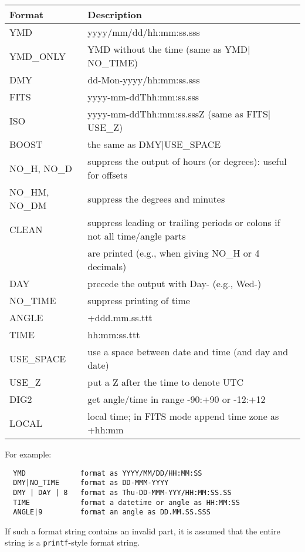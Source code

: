 \begin{itemize}
\begin{tabular}{ll}
  Format & Description \\ \hline
 YMD & yyyy/mm/dd/hh:mm:ss.sss\\
 YMD\_ONLY & YMD without the time (same as YMD$|$NO\_TIME)\\
 DMY & dd-Mon-yyyy/hh:mm:ss.sss\\
 FITS & yyyy-mm-ddThh:mm:ss.sss\\
 ISO & yyyy-mm-ddThh:mm:ss.sssZ (same as FITS$|$USE\_Z)\\
 BOOST & the same as DMY$|$USE\_SPACE\\
 NO\_H, NO\_D & suppress
		the output of hours (or degrees): useful for offsets\\
 NO\_HM, NO\_DM &
		suppress the degrees and minutes\\
 CLEAN & suppress leading or trailing
		periods or colons if not all time/angle
                parts\\
            & are printed (e.g., when giving NO\_H or 4 decimals)\\
 DAY & precede the output with Day- (e.g., Wed-)\\
 NO\_TIME & suppress printing of time\\
 ANGLE & +ddd.mm.ss.ttt\\
 TIME & hh:mm:ss.ttt\\
 USE\_SPACE & use a space between date and time (and day and date)\\
 USE\_Z & put a Z after the time to denote UTC\\
 DIG2 & get angle/time in range -90:+90 or -12:+12\\
 LOCAL & local time; in FITS mode append time zone
  as +hh:mm\\
\end{tabular}

  For example:
\begin{verbatim}
  YMD             format as YYYY/MM/DD/HH:MM:SS
  DMY|NO_TIME     format as DD-MMM-YYYY
  DMY | DAY | 8   format as Thu-DD-MMM-YYY/HH:MM:SS.SS
  TIME            format a datetime or angle as HH:MM:SS
  ANGLE|9         format an angle as DD.MM.SS.SSS
\end{verbatim}
If such a format string contains an invalid part, it is assumed that
the entire string is a \texttt{printf}-style format string.
\end{itemize}

